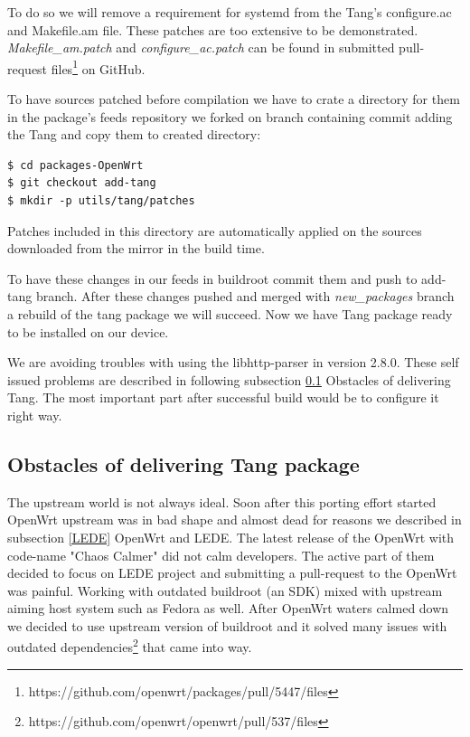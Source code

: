 To do so we will remove a requirement for systemd from the Tang's configure.ac and Makefile.am file.
These patches are too extensive to be demonstrated.
{\it Makefile\_am.patch} and {\it configure\_ac.patch} can be found in submitted pull-request files\footnote{https://github.com/openwrt/packages/pull/5447/files} on GitHub.

To have sources patched before compilation we have to crate a directory for them in the package's feeds repository we forked on branch containing commit adding the Tang and copy them to created directory:
\begin{lstlisting}[columns=fixed,basicstyle=\ttfamily\footnotesize,tabsize=4,backgroundcolor=\color{yellow!10}]
$ cd packages-OpenWrt
$ git checkout add-tang
$ mkdir -p utils/tang/patches
\end{lstlisting}
Patches included in this directory are automatically applied on the sources downloaded from the mirror in the build time.

To have these changes in our feeds in buildroot commit them and push to add-tang branch.
After these changes pushed and merged with {\it new\_packages} branch a rebuild of the tang package we will succeed.
Now we have Tang package ready to be installed on our device.

We are avoiding troubles with using the libhttp-parser in version 2.8.0.
These self issued problems are described in following subsection \ref{porting_problems} Obstacles of delivering Tang.
The most important part after successful build would be to configure it right way.



\subsection{Obstacles of delivering Tang package}\label{porting_problems}

The upstream world is not always ideal.
Soon after this porting effort started OpenWrt upstream was in bad shape and almost dead for reasons we described in subsection \ref{LEDE} OpenWrt and LEDE.
The latest release of the OpenWrt with code-name "Chaos Calmer" did not calm developers.
The active part of them decided to focus on LEDE project and submitting a pull-request to the OpenWrt was painful.
Working with outdated buildroot (an SDK) mixed with upstream aiming host system such as Fedora as well.
After OpenWrt waters calmed down we decided to use upstream version of buildroot and it solved many issues with outdated dependencies\footnote{https://github.com/openwrt/openwrt/pull/537/files} that came into way.

